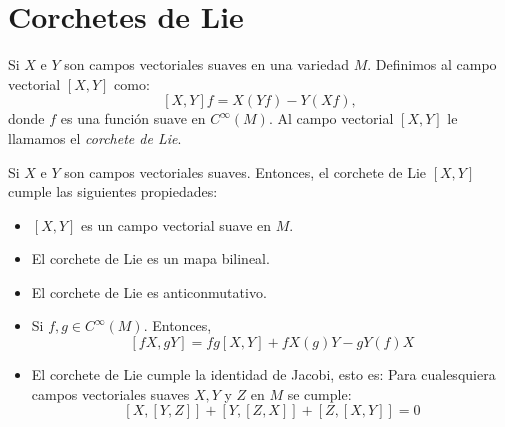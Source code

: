 \chapter{Corchetes de Lie}\label{Anexo: Corchetes de Lie}
\begin{definition}
	Si $X$ e $Y$ son campos vectoriales suaves en una variedad $M$. Definimos al campo vectorial $[X,Y]$ como:
	\[
		[X,Y]f = X(Yf) - Y(Xf),
	\]
	donde $f$ es una función suave en $C^{\infty}(M)$. Al campo vectorial $[X,Y]$ le llamamos el \textit{corchete de Lie}.
\end{definition}

\begin{lemma}
	Si $X$ e $Y$ son campos vectoriales suaves. Entonces, el corchete de Lie $[X,Y]$ cumple las siguientes propiedades:
	\begin{itemize}
		\item $[X,Y]$ es un campo vectorial suave en $M$.
		\item El corchete de Lie es un mapa bilineal.
		\item El corchete de Lie es anticonmutativo.
		\item Si $f,g \in C^{\infty}(M)$. Entonces,
		      \[
			      [fX,gY] = fg[X,Y] + fX(g)Y - gY(f)X
		      \]
		\item El corchete de Lie cumple la identidad de Jacobi, esto es: Para cualesquiera campos vectoriales suaves $X,Y$ y $Z$ en $M$ se cumple:
		      \[
			      [X,[Y,Z]] + [Y,[Z,X]] + [Z,[X,Y]] = 0
		      \]
	\end{itemize}
\end{lemma}

